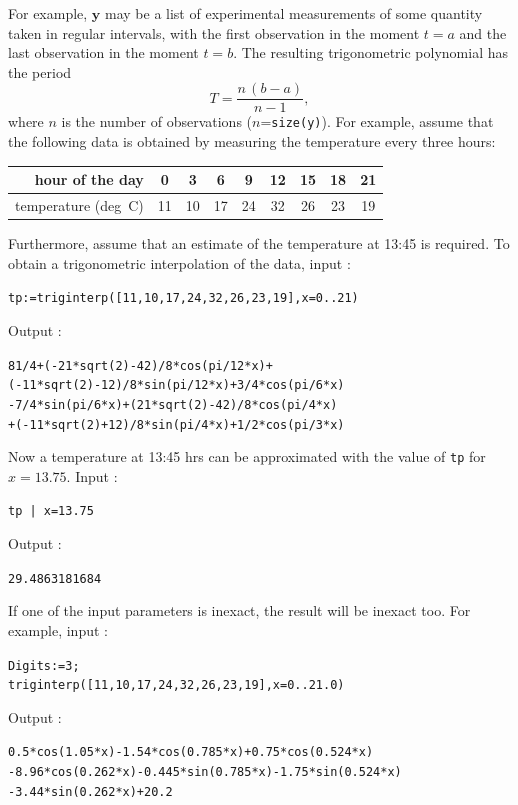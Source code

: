 \documentclass[a4paper,11pt]{book}
\begin{document}
For example, $ \textbf{y} $ may be a list of experimental measurements of some quantity taken in regular intervals, with the first observation in the moment $ t=a $ and the last observation in the moment $ t=b $. The resulting trigonometric polynomial has the period
\[ T=\frac{n\,(b-a)}{n-1}, \]
where $ n $ is the number of observations ($ n $={\tt size(y)}). For example, assume that the following data is obtained by measuring the temperature every three hours:
\begin{center}
	\begin{tabular}{|r|c|c|c|c|c|c|c|c|}
		\hline hour of the day&0&3&6&9&12&15&18&21\\
		\hline temperature (deg~C)&11&10&17&24&32&26&23&19\\\hline
	\end{tabular}
\end{center}
Furthermore, assume that an estimate of the temperature at 13:45 is required. To obtain a trigonometric interpolation of the data, input :
\begin{center}
	{\tt tp:=triginterp([11,10,17,24,32,26,23,19],x=0..21)}
\end{center}
Output :
\begin{center}
	{\tt 81/4+(-21*sqrt(2)-42)/8*cos(pi/12*x)+\\
		(-11*sqrt(2)-12)/8*sin(pi/12*x)+3/4*cos(pi/6*x)\\
		-7/4*sin(pi/6*x)+(21*sqrt(2)-42)/8*cos(pi/4*x)\\
		+(-11*sqrt(2)+12)/8*sin(pi/4*x)+1/2*cos(pi/3*x)}
\end{center}
Now a temperature at 13:45 hrs can be approximated with the value of {\tt tp} for $ x=13.75 $. Input :
\begin{center}
	{\tt tp | x=13.75}
\end{center}
Output :
\begin{center}
	{\tt 29.4863181684}
\end{center}

If one of the input parameters is inexact, the result will be inexact too. For example, input :
\begin{center}
	{\tt Digits:=3;\\
		triginterp([11,10,17,24,32,26,23,19],x=0..21.0)}
\end{center}
Output :
\begin{center}
	{\tt 0.5*cos(1.05*x)-1.54*cos(0.785*x)+0.75*cos(0.524*x)\\
		-8.96*cos(0.262*x)-0.445*sin(0.785*x)-1.75*sin(0.524*x)\\
		-3.44*sin(0.262*x)+20.2}
\end{center}
\end{document}
